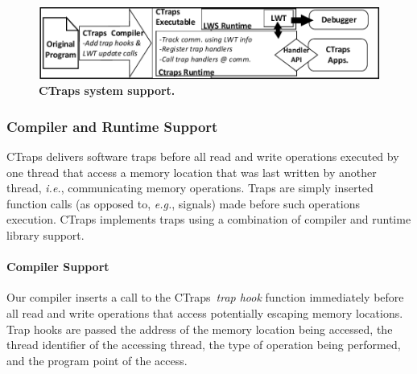 \documentclass[preprint,10pt]{sigplanconf}
\newcommand{\ctraps}{CTraps\xspace}
\begin{document}
\begin{figure}[htb]
\centering
\includegraphics[width=.90\columnwidth]{figs/CTraps_Overview.pdf}
\caption{\label{fig:systemdiagram}{\bf CTraps system support.}}
\end{figure}



\subsubsection{Compiler and Runtime Support} 

\ctraps delivers software traps before all read and write operations executed
by one thread that access a memory location that was last written by another
thread, {\em i.e.}, communicating memory operations.  Traps are simply inserted
function calls (as opposed to, {\em e.g.}, signals) made before such operations
execution.  \ctraps implements traps using a combination of compiler and
runtime library support.   

\paragraph{Compiler Support}
Our compiler inserts a call to the \ctraps~{\em trap hook} function immediately
before all read and write operations that access potentially escaping memory
locations.  Trap hooks are passed the address of the memory location being
accessed, the thread identifier of the accessing thread, the type of operation
being performed, and the program point of the access.  
\end{document}
